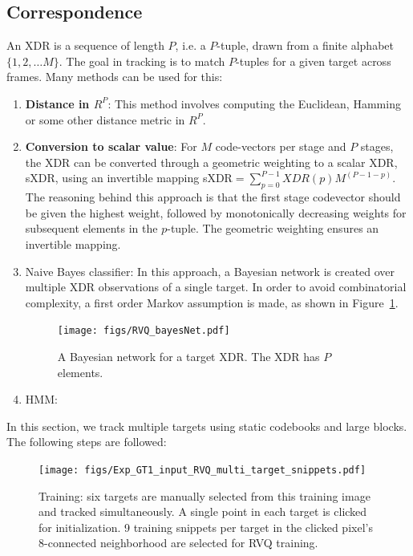 \documentclass[12pt,letterpaper,doublespaced,ETD]{gt-ece-thesis} %
\begin{document}
\begin{Body}
\section{Correspondence}
An XDR is a sequence of length $P$, i.e. a $P$-tuple, drawn from a finite alphabet $\{1, 2, \ldots M\}$.  The goal in tracking is to match $P$-tuples for a given target across frames.  Many methods can be used for this:

\begin{enumerate}
	\item \textbf{Distance in $R^P$}:  This method involves computing the Euclidean, Hamming or some other distance metric in $R^P$.  
	\item \textbf{Conversion to scalar value}: For $M$ code-vectors per stage and $P$ stages, the XDR can be converted through a geometric weighting to a scalar XDR, sXDR, using an invertible mapping sXDR$=\sum_{p=0}^{P-1}XDR(p)M^{(P-1-p)}$.  The reasoning behind this approach is that the first stage codevector should be given the highest weight, followed by monotonically decreasing weights for subsequent elements in the $p$-tuple.  The geometric weighting ensures an invertible mapping.
	\item Naive Bayes classifier:  In this approach, a Bayesian network is created over multiple XDR observations of a single target.  In order to avoid combinatorial complexity, a first order Markov assumption is made, as shown in Figure~\ref{fig:RVQ_bayesNet}.

\begin{figure}
\centering
\texttt{[image: figs/RVQ\_bayesNet.pdf]}
\caption{A Bayesian network for a target XDR.  The XDR has $P$ elements.}
\label{fig:RVQ_bayesNet}
\end{figure}

	\item HMM:
\end{enumerate}


In this section, we track multiple targets using static codebooks and large blocks.
The following steps are followed:

\begin{figure}
\centering
\texttt{[image: figs/Exp\_GT1\_input\_RVQ\_multi\_target\_snippets.pdf]}
\caption{Training: six targets are manually selected from this training image and tracked simultaneously.  A single point in each target is clicked for initialization.  9 training snippets per target in the clicked pixel's 8-connected neighborhood are selected for RVQ training.}
\label{fig:Exp1_results_RVQ_input}
\end{figure}


\end{Body}
\end{document}
